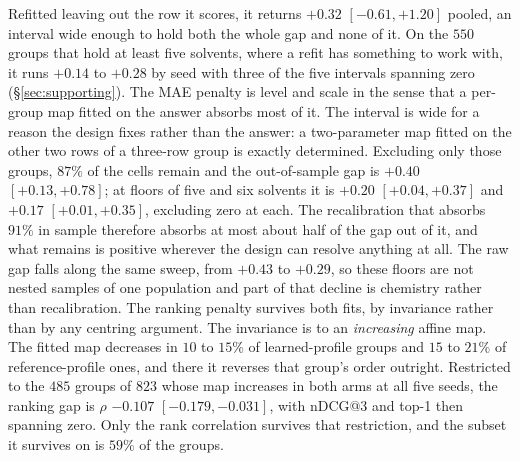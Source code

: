 Refitted
leaving out the row it scores, it returns $+0.32$ $[-0.61,+1.20]$ pooled, an interval wide enough to
hold both the whole gap and none of it. On the
$550$ groups that hold at least five solvents, where a refit has something to work with, it runs
$+0.14$ to $+0.28$ by seed with three of the five intervals spanning zero
(\S\ref{sec:supporting}). The MAE penalty is level and scale in the sense that a per-group map
fitted on the answer absorbs most of it.
The interval is wide for a reason the design fixes rather than the answer: a two-parameter map
fitted on the other two rows of a three-row group is exactly determined. Excluding only those groups, $87\%$ of the cells remain and the out-of-sample gap is
$+0.40$ $[+0.13,+0.78]$; at floors of five and six solvents it is $+0.20$ $[+0.04,+0.37]$ and $+0.17$
$[+0.01,+0.35]$, excluding zero at each. The recalibration that absorbs $91\%$ in sample therefore
absorbs at most about half of the gap out of it, and what remains is positive wherever the design
can resolve anything at all. The raw gap falls along the same sweep, from $+0.43$ to $+0.29$, so
these floors are not nested samples of one population and part of that decline is chemistry rather
than recalibration. The ranking penalty survives both fits, by invariance rather than
by any centring argument. The invariance is to an \emph{increasing} affine map. The fitted map
decreases in $10$ to $15\%$ of learned-profile groups and $15$ to $21\%$ of reference-profile ones,
and there it reverses that group's order outright. Restricted to the $485$ groups
of $823$ whose map increases in both arms at all five seeds, the ranking gap is $\rho$ $-0.107$
$[-0.179,-0.031]$, with nDCG@3 and top-1 then spanning zero. Only the rank correlation survives
that restriction, and the subset it survives on is $59\%$ of the groups.

